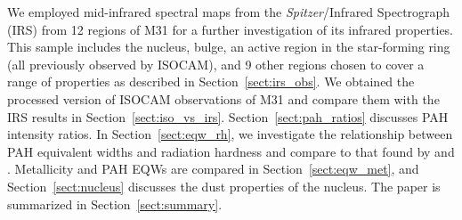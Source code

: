 We employed mid-infrared spectral maps from the {\em Spitzer}/Infrared Spectrograph (IRS) from 12 regions of M31 for a further investigation of 
its infrared properties. This sample includes the nucleus, bulge, an active region in the star-forming ring (all previously observed by ISOCAM), and 9 
other regions chosen to cover a range of properties as described in Section~\ref{sect:irs_obs}. 
We obtained the processed version of ISOCAM observations of M31 and compare them with the IRS results in Section~\ref{sect:iso_vs_irs}. 
Section~\ref{sect:pah_ratios} discusses PAH intensity ratios.
In Section~\ref{sect:eqw_rh}, we investigate the relationship between PAH equivalent widths and radiation 
hardness and compare to that found by \citet{Engelbracht_2008} and \citet{Gordon:2008lr}. Metallicity and PAH EQWs are compared in 
Section~\ref{sect:eqw_met}, and Section~\ref{sect:nucleus} discusses the dust properties of the nucleus. The paper is summarized in Section~\ref{sect:summary}.

